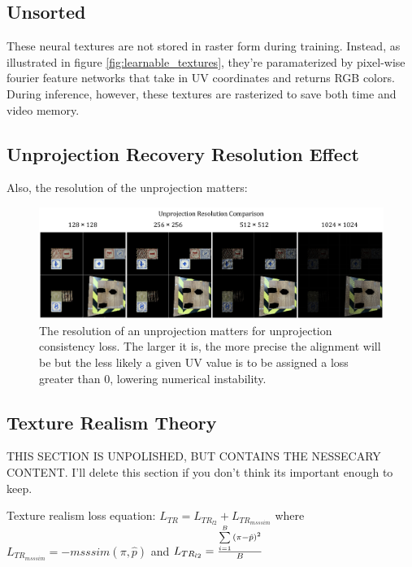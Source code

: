 \documentclass{article}
\begin{document}
    \subsection{Unsorted}
     	These neural textures are not stored in raster form during training. Instead, as illustrated in figure \ref{fig:learnable_textures}, they're paramaterized by pixel-wise fourier feature networks \cite{fourier_feature_networks} that take in UV coordinates and returns RGB colors. During inference, however, these textures are rasterized to save both time and video memory.

	\subsection*{Unprojection Recovery Resolution Effect}

		Also, the resolution of the unprojection matters:



		\begin{figure}[H]
			\begin{center}
				\includegraphics[width=400pt]{../images/unprojection_resolution_comparison.pdf}
			\end{center}
			\caption{
				The resolution of an unprojection matters for unprojection consistency loss. The larger it is, the more precise the alignment will be but the less likely a given UV value is to be assigned a loss greater than 0, lowering numerical instability.
			}
			\label{fig:unprojection_resolution_comparison}
		\end{figure}

	\subsection*{Texture Realism Theory}
		\label{sec:texture_realism_theory}


		THIS SECTION IS UNPOLISHED, BUT CONTAINS  THE NESSECARY CONTENT.
		I'll delete this section if you don't think its important enough to keep.

		Texture realism loss equation:
		$L_{TR}=L_{TR_{l2}}+L_{TR_{msssim}}$
		where 
		$L_{TR_{msssim}} = -msssim(\pi,\hat{p})$ and
		$L_{TR_{l2}} = \frac{
			\sum\limits_{i=1}^B {
			\left( \pi-\hat{p}  \right)^2
				} 
		}
		{B}$
\end{document}
